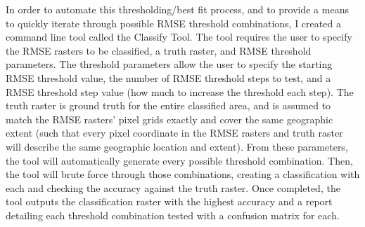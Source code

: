 In order to automate this thresholding/best fit process, and to provide a means to quickly iterate through possible RMSE threshold combinations, I created a command line tool called the Classify Tool. The tool requires the user to specify the RMSE rasters to be classified, a truth raster, and RMSE threshold parameters. The threshold parameters allow the user to specify the starting RMSE threshold value, the number of RMSE threshold steps to test, and a RMSE threshold step value (how much to increase the threshold each step). The truth raster is ground truth for the entire classified area, and is assumed to match the RMSE rasters’ pixel grids exactly and cover the same geographic extent (such that every pixel coordinate in the RMSE rasters and truth raster will describe the same geographic location and extent). From these parameters, the tool will automatically generate every possible threshold combination. Then, the tool will brute force through those combinations, creating a classification with each and checking the accuracy against the truth raster. Once completed, the tool outputs the classification raster with the highest accuracy and a report detailing each threshold combination tested with a confusion matrix for each.
